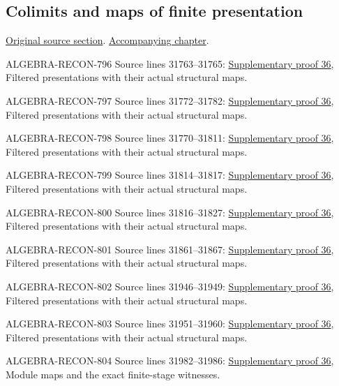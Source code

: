 \subsection{Colimits and maps of finite presentation}
\hypertarget{algebra-source-section-colimits-flat}{}
\noindent\href{https://github.com/stacks/stacks-project/blob/a04446e57ec1fbc252a871afcec7752fb2807b14/algebra.tex\#L31759}{Original source section}. \href{algebra.pdf\#nameddest=section-colimits-flat}{Accompanying chapter}.

\begin{AlgebraSourceRoutes}
\item[ALGEBRA-RECON-796] Source lines 31763--31765: \hyperlink{algebra_colimit_categories_notes_20260928}{Supplementary proof 36}, Filtered presentations with their actual structural maps.
\item[ALGEBRA-RECON-797] Source lines 31772--31782: \hyperlink{algebra_colimit_categories_notes_20260928}{Supplementary proof 36}, Filtered presentations with their actual structural maps.
\item[ALGEBRA-RECON-798] Source lines 31770--31811: \hyperlink{algebra_colimit_categories_notes_20260928}{Supplementary proof 36}, Filtered presentations with their actual structural maps.
\item[ALGEBRA-RECON-799] Source lines 31814--31817: \hyperlink{algebra_colimit_categories_notes_20260928}{Supplementary proof 36}, Filtered presentations with their actual structural maps.
\item[ALGEBRA-RECON-800] Source lines 31816--31827: \hyperlink{algebra_colimit_categories_notes_20260928}{Supplementary proof 36}, Filtered presentations with their actual structural maps.
\item[ALGEBRA-RECON-801] Source lines 31861--31867: \hyperlink{algebra_colimit_categories_notes_20260928}{Supplementary proof 36}, Filtered presentations with their actual structural maps.
\item[ALGEBRA-RECON-802] Source lines 31946--31949: \hyperlink{algebra_colimit_categories_notes_20260928}{Supplementary proof 36}, Filtered presentations with their actual structural maps.
\item[ALGEBRA-RECON-803] Source lines 31951--31960: \hyperlink{algebra_colimit_categories_notes_20260928}{Supplementary proof 36}, Filtered presentations with their actual structural maps.
\item[ALGEBRA-RECON-804] Source lines 31982--31986: \hyperlink{algebra_colimit_categories_notes_20260928}{Supplementary proof 36}, Module maps and the exact finite-stage witnesses.

\end{AlgebraSourceRoutes}
